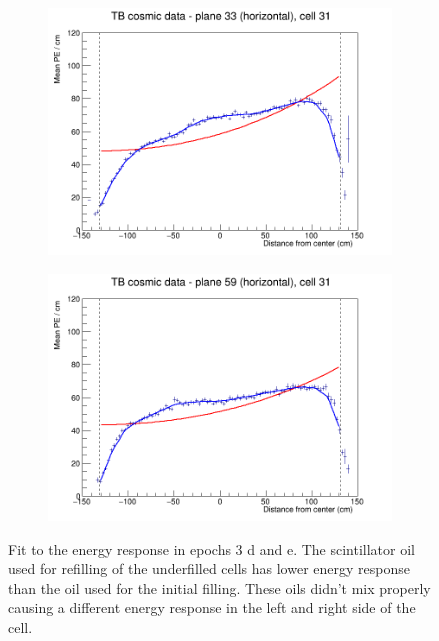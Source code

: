 \documentclass[12pt,a4paper]{article}
\begin{document}
\begin{figure}[h]
  \begin{subfigure}{0.5\textwidth}
    \includegraphics[width=\linewidth]{RelativeCalibrationResults/ep3de_033_031.png}
  \end{subfigure}
  \begin{subfigure}{0.5\textwidth}
    \includegraphics[width=\linewidth]{RelativeCalibrationResults/ep3de_059_031.png}
  \end{subfigure}
  \caption{Fit to the energy response in epochs 3 d and e. The scintillator oil used for refilling of the underfilled cells has lower energy response than the oil used for the initial filling. These oils didn't mix properly causing a different energy response in the left and right side of the cell.}
  \label{figAttenfitResultsEpoch3de_RefilledDiscrepancy}
\end{figure}
\end{document}
